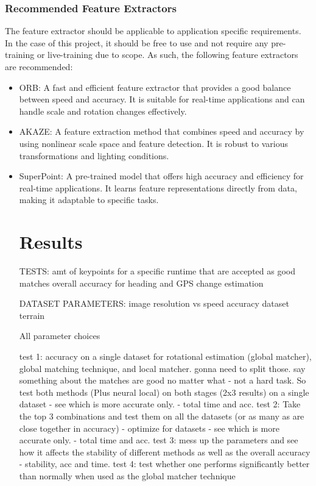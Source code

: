 \subsection{Recommended Feature Extractors}
The feature extractor should be applicable to application specific requirements. In the case of this project, it should be free to use and not require any pre-training or live-training due to scope. As such, the following feature extractors are recommended:
\begin{itemize}
    \item ORB: A fast and efficient feature extractor that provides a good balance between speed and accuracy. It is suitable for real-time applications and can handle scale and rotation changes effectively.
    \item AKAZE: A feature extraction method that combines speed and accuracy by using nonlinear scale space and feature detection. It is robust to various transformations and lighting conditions.
    \item SuperPoint: A pre-trained model that offers high accuracy and efficiency for real-time applications. It learns feature representations directly from data, making it adaptable to specific tasks.


    


\chapter{Results}

TESTS:
amt of keypoints for a specific runtime that are accepted as good matches
overall accuracy for heading and GPS change estimation


DATASET PARAMETERS:
image resolution vs speed accuracy
dataset terrain



All parameter choices




test 1: accuracy on a single dataset for rotational estimation (global matcher), global matching technique, and local matcher. gonna need to split those. say something about the matches are good no matter what  - not a hard task.
So test both methods (Plus neural local) on both stages (2x3 results) on a single dataset - see which is more accurate only. - total time and acc.
test 2: Take the top 3 combinations and test them on all the datasets (or as many as are close together in accuracy) - optimize for datasets - see which is more accurate only. - total time and acc. 
test 3: mess up the parameters and see how it affects the stability of different methods as well as the overall accuracy - stability, acc and time. 
test 4: test whether one performs significantly better than normally when used as the global matcher technique


\end{itemize}
